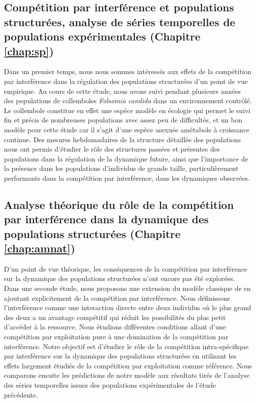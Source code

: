 \subsection{Compétition par interférence et populations structurées,
analyse de séries temporelles de populations expérimentales (Chapitre \ref{chap:sp})}

Dans un premier temps, nous nous sommes intéressés aux effets de la compétition
par interférence dans la régulation des populations structurées d'un point de
vue empirique. Au cours de cette étude, nous avons suivi pendant plusieurs années
des populations de collemboles \textit{Folsomia candida} dans un environnement
contrôlé. Le collembole constitue en effet une espèce modèle en écologie
\autocites{fountain2005a} qui permet le suivi fin et précis de nombreuses
populations avec assez peu de difficultés, et un bon modèle pour cette étude car
il s'agit d'une espèce asexuée amétabole à croissance continue.
Des mesures hebdomadaires de la structure détaillée des populations nous ont permis d'étudier le rôle des
structures passées et présentes des populations dans la régulation de la
dynamique future, ainsi que l'importance de la présence dans les populations
d'individus de grande taille, particulièrement performants dans la compétition par interférence, dans les
dynamiques observées. 

\subsection{Analyse théorique du rôle de la compétition par interférence dans
la dynamique des populations structurées (Chapitre \ref{chap:amnat})}

D'un point de vue théorique, les conséquences de la compétition par interférence
sur la dynamique des populations structurées n'ont encore pas été explorées.
Dans une seconde étude, nous proposons une extension du modèle classique de
\textcites{kooijman1984a} en ajoutant explicitement de la compétition par
interférence. Nous définissons l'interférence comme une interaction directe
entre deux individus où le plus grand des deux a un avantage compétitif qui
réduit les possibilités du plus petit d'accéder à la ressource. Nous étudions
différentes conditions allant d'une compétition par exploitation pure à une
domination de la compétition par interférence. Notre objectif est d'étudier le
rôle de la compétition intra-spécifique par interférence sur la dynamique des
populations structurées en utilisant les effets largement étudiés de la
compétition par exploitation comme référence. Nous comparons ensuite les
prédictions de notre modèle aux résultats tirés de l'analyse des séries
temporelles issues des populations expérimentales de l'étude précédente.


